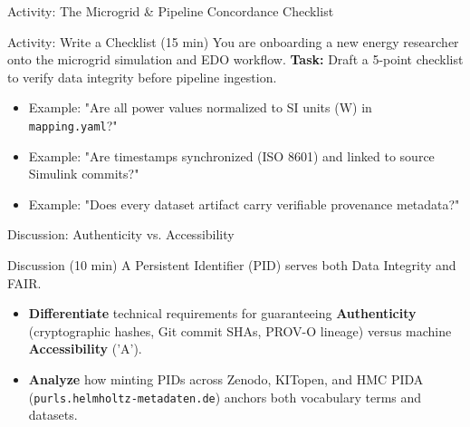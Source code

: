 \documentclass[aspectratio=169]{beamer}
\let\pause\relax
\begin{document}
\begin{frame}{Activity: The Microgrid \& Pipeline Concordance Checklist}
    \begin{block}{Activity: Write a Checklist (15 min)}
        You are onboarding a new energy researcher onto the microgrid simulation and EDO workflow.
        \pause
        \textbf{Task:} Draft a 5-point checklist to verify data integrity before pipeline ingestion.
        \begin{itemize}
            \item \pause Example: "Are all power values normalized to SI units ($\text{W}$) in \texttt{mapping.yaml}?"
            \item \pause Example: "Are timestamps synchronized (ISO 8601) and linked to source Simulink commits?"
            \item \pause Example: "Does every dataset artifact carry verifiable provenance metadata?"
        \end{itemize}
    \end{block}
\end{frame}

\begin{frame}{Discussion: Authenticity vs. Accessibility}
    \begin{block}{Discussion (10 min)}
        A Persistent Identifier (PID) serves both Data Integrity and FAIR.
        \pause
        \begin{itemize}
            \item \textbf{Differentiate} technical requirements for guaranteeing \textbf{Authenticity} (cryptographic hashes, Git commit SHAs, PROV-O lineage) versus machine \textbf{Accessibility} ('A').
            \pause
            \item \textbf{Analyze} how minting PIDs across Zenodo, KITopen, and HMC PIDA (\texttt{purls.helmholtz-metadaten.de}) anchors both vocabulary terms and datasets.
        \end{itemize}
    \end{block}
\end{frame}
\end{document}
